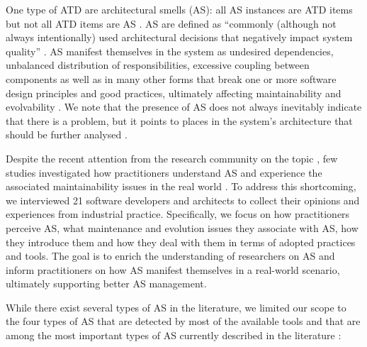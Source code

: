 One type of ATD are architectural smells (AS): all AS instances are ATD items but not all ATD items are AS \cite{Verdecchia2018}. AS are defined as ``commonly (although not always intentionally) used architectural decisions that negatively impact system quality'' \cite{Garcia2009}. AS manifest themselves in the system as undesired dependencies, unbalanced distribution of responsibilities, excessive coupling between components as well as in many other forms that break one or more software design principles and good practices, ultimately affecting maintainability and evolvability \cite{Lippert2006}. We note that the presence of AS does not always inevitably indicate that there is a problem, but it points to places in the system's architecture that should be further analysed  \cite{Lippert2006}.

Despite the recent attention from the research community on the topic \cite{Verdecchia2018}, few studies investigated how practitioners understand AS and experience the associated maintainability issues in the real world \cite{Arcelli2020}. To address this shortcoming, we interviewed 21 software developers and architects to collect their opinions and experiences from industrial practice.  Specifically, we focus on how practitioners perceive AS, what maintenance and evolution issues they associate with AS, how they introduce them and how they deal with them in terms of adopted practices and tools. The goal is to enrich the understanding of researchers on AS and inform practitioners on how AS manifest themselves in a real-world scenario, ultimately supporting better AS management. 

While there exist several types of AS in the literature, we limited our scope to the four types of AS that are detected by most of the available tools \cite{Azadi2019} and that are among the most important types of AS currently described in the literature \cite{Arcelli2020}:

